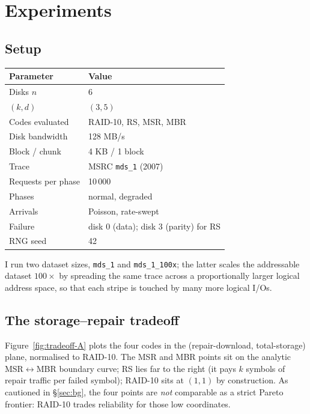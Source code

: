 \documentclass[letterpaper,twocolumn,10pt]{article}
\begin{document}
\section{Experiments}
\label{sec:exp}

\subsection{Setup}

\begin{center}
\small
\begin{tabular}{@{}ll@{}}
\toprule
Parameter & Value \\
\midrule
Disks $n$               & 6 \\
$(k, d)$                & $(3, 5)$ \\
Codes evaluated         & RAID-10, RS, MSR, MBR \\
Disk bandwidth          & 128 MB/s \\
Block / chunk           & 4 KB / 1 block \\
Trace                   & MSRC \texttt{mds\_1} (2007) \\
Requests per phase      & 10\,000 \\
Phases                  & normal, degraded \\
Arrivals                & Poisson, rate-swept \\
Failure                 & disk 0 (data); disk 3 (parity) for RS \\
RNG seed                & 42 \\
\bottomrule
\end{tabular}
\end{center}

\noindent I run two dataset sizes, \texttt{mds\_1} and \texttt{mds\_1\_100x}; the
latter scales the addressable dataset $100\times$ by spreading the same
trace across a proportionally larger logical address space, so that each
stripe is touched by many more logical I/Os.

\subsection{The storage--repair tradeoff}

Figure~\ref{fig:tradeoff-A} plots the four codes in the
(repair-download, total-storage) plane, normalised to RAID-10. The MSR and
MBR points sit on the analytic MSR$\leftrightarrow$MBR boundary curve;
RS lies far to the right (it pays $k$ symbols of repair traffic per failed
symbol); RAID-10 sits at $(1,1)$ by construction. As cautioned in
\S\ref{sec:bg}, the four points are \emph{not} comparable as a strict Pareto
frontier: RAID-10 trades reliability for those low coordinates.
\end{document}
